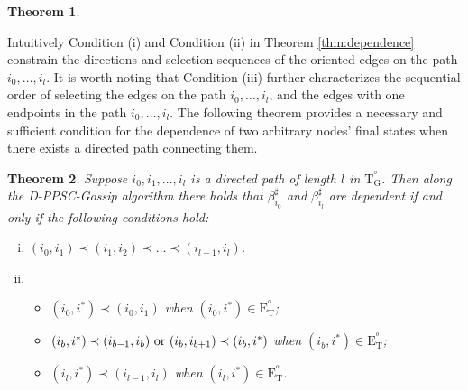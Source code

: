 \documentclass[a4paper, 11pt]{article}
\newcommand{\1}{\mathbf{1}}
\DeclareMathOperator{\sgn}{sgn}
\newcommand{\mG}{\mathrm{G}}
\newcommand{\mE}{\mathrm{E}}
\newcommand{\mT}{\mathrm{T}}
\newcommand{\mTG}{\mT^{^o}_{\mG}}
\newcommand{\mET}{\mE_{\mT}^{^o}}
\newtheorem{theorem}{Theorem}
\begin{document}
\begin{theorem}
	
	
	
\end{theorem}

\medskip

{Intuitively Condition (i) and Condition (ii) in Theorem \ref{thm:dependence} constrain the directions and selection sequences of the oriented edges on the path $i_0,\dots,i_l$. It is worth noting that Condition (iii) further characterizes the sequential order of selecting the edges on the path $i_0,\dots,i_l$, and the edges with one endpoints in the path $i_0,\dots,i_l$.} The following theorem provides a necessary and sufficient condition for the dependence of two arbitrary nodes' final states when there exists a directed path connecting them.

\medskip

\begin{theorem}\label{thm:dependence_directed_path}
	Suppose $i_0,i_1,\dots,i_l$ is a directed path of length $l$ in $\mTG$.  Then along the D-PPSC-Gossip algorithm there holds that  $\beta^\sharp_{i_0}$ and $\beta^\sharp_{i_l}$ are dependent if and only if the following conditions hold:
	\begin{enumerate}[(i)]
		\item $(i_0,i_{1})\prec(i_1,i_2)\prec\dots\prec(i_{l-1},i_l)$.
		\item
		\begin{itemize}
			\item[a)] $(i_0,i^\ast)\prec(i_0,i_{1})$ when $(i_0,i^\ast)\in\mET$;
			\item[b)] $(i_b,i^\ast)\prec(i_{b-1},i_{b})\textnormal{ or }(i_b,i_{b+1})\prec(i_b,i^\ast)$ when $(i_b,i^\ast)\in\mET$;
			\item[c)] $(i_l,i^\ast)\prec(i_{l-1},i_l)$ when $(i_l,i^\ast)\in\mET$.
		\end{itemize}
	\end{enumerate}
\end{theorem}
\end{document}
